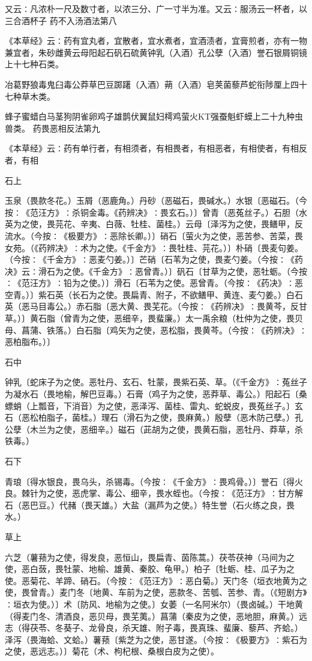 \documentclass[a4paper,12pt,UTF8,twoside]{ctexbook}
\begin{document}
又云∶凡浓朴一尺及数寸者，以浓三分、广一寸半为准。又云∶服汤云一杯者，以三合酒杯子
药不入汤酒法第八

《本草经》云∶药有宜丸者，宜散者，宜水煮者，宜酒渍者，宜膏煎者，亦有一物兼宜者，朱砂雌黄云母阳起石矾石硫黄钟乳（入酒）孔公孽（入酒）誉石银屑铜镜上十七种石类。

冶葛野狼毒鬼臼毒公莽草巴豆踯躇（入酒）蒴（入酒）皂荚菌藜芦蛇衔陟厘上四十七种草木类。

蜂子蜜蜡白马茎狗阴雀卵鸡子雄鹊伏翼鼠妇樗鸡萤火KT强蚕魁虾蟆上二十九种虫兽类。
药畏恶相反法第九

《本草经》云∶药有单行者，有相须者，有相畏者，有相恶者，有相使者，有相反者，有相

石上

玉泉（畏款冬花。）玉屑（恶鹿角。）丹砂（恶磁石，畏碱水。）水银〔恶磁石。（今按∶《范汪方》∶杀铜金毒。《药辨决》∶畏玄石。）〕曾青（恶菟丝子。）石胆（水英为之使，畏芫花、辛夷、白薇、牡桂、菌桂。）云母〔泽泻为之使，畏鳝甲，反流水。（今按∶《极要方》∶恶除长卿。）〕硝石〔萤火为之使，恶苦参、苦菜，畏女苑。（《药辨决》∶术为之使。《千金方》∶畏牡桂、芫花。）〕朴硝〔畏麦句姜。（今按∶《千金方》∶恶麦勺姜。）〕芒硝〔石苇为之使，畏麦勺姜。（今按∶《药决》云∶滑石为之使。《千金方》∶恶曾青。）〕矾石〔甘草为之使，恶牡蛎。（今按∶《范汪方》∶铅为之使。）〕滑石〔石苇为之使。恶曾青。（今按∶《药决》∶恶空青。）〕紫石英（长石为之使。畏扁青、附子，不欲鳝甲、黄连、麦勺姜。）白石英（恶马目毒公。）赤石脂〔恶大黄、畏芜花。（今按∶《药辨决》∶畏黄芩，反甘草。）〕黄石脂（曾青为之使，恶细辛，畏蜚廉。）太一禹余粮（杜仲为之使，畏贝母、菖蒲、铁落。）白石脂〔鸡矢为之使，恶松脂，畏黄芩。（今按∶《药辨决》∶恶柏脂布。）〕

石中

钟乳〔蛇床子为之使。恶牡丹、玄石、牡蒙，畏紫石英、草。（《千金方》∶菟丝子为凝水石（畏地榆，解巴豆毒。）石膏（鸡子为之使，恶莽草、毒公。）阳起石〔桑螵蛸（上瓢音，下消音）为之使，恶泽泻、菌桂、雷丸、蛇蜕皮，畏菟丝子。〕玄石（恶松柏脂子，菌桂。）理石（滑石为之使，畏麻黄。）殷孽（恶木防己孽。）孔公孽（木兰为之使，恶细辛。）磁石（茈胡为之使，畏黄石脂，恶牡丹、莽草，杀铁毒。）

石下

青琅〔得水银良，畏乌头，杀锡毒。（今按∶《千金方》∶畏鸡骨。）〕誉石〔得火良。棘针为之使，恶虎掌、毒公、细辛，畏水蛭也。（今按∶《范汪方》∶甘方解石（恶巴豆。）代赭（畏天雄。）大盐（漏芦为之使。）特生誉（石火练之良，畏水。）

草上

六芝（薯蓣为之使，得发良，恶恒山，畏扁青、茵陈蒿。）茯苓茯神（马间为之使，恶白蔹，畏牡蒙、地榆、雄黄、秦胶、龟甲。）柏子〔牡蛎、桂、瓜子为之使。恶菊花、羊蹄、硝石。（今按∶《范汪方》∶恶白菊。）天门冬（垣衣地黄为之使，畏曾青。）麦门冬〔地黄、车前为之使，恶款冬、苦瓠、苦参、青。（《短剧方》∶垣衣为使。）〕术〔防风、地榆为之使。〕女萎（一名阿米尔）（畏卤碱。）干地黄（得麦门冬、清酒良，恶贝母，畏芜荑。）菖蒲（秦皮为之使，恶地胆，麻黄。）远志（得茯苓、冬葵子、龙骨良，杀天雄、附子毒，畏真珠、蜚廉、藜芦、齐蛤。）泽泻（畏海蛤、文蛤。）薯蓣〔紫芝为之使，恶甘遂。（今按∶《极要方》∶紫石为之使，恶远志。）〕菊花（术、枸杞根、桑根白皮为之使）。
\end{document}
